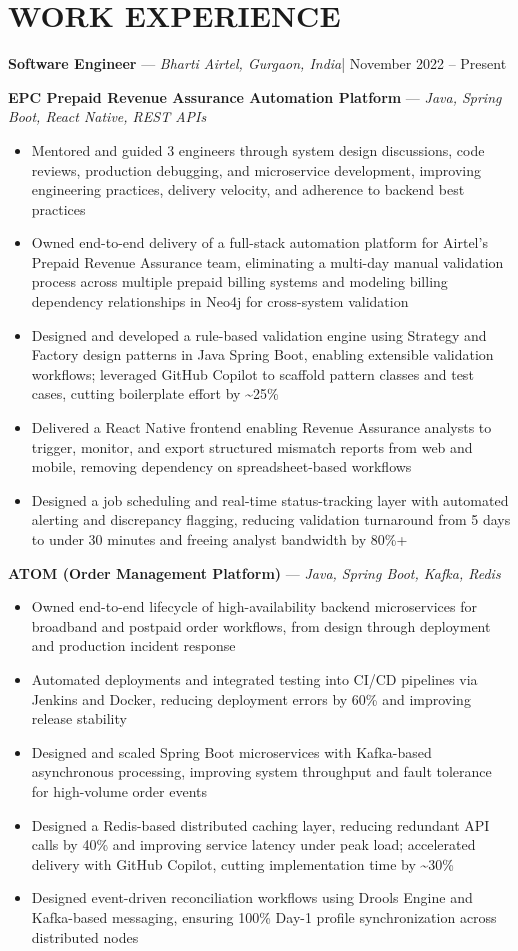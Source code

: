 \documentclass[10.5pt,a4paper]{article}
\newcommand{\role}[3]{\textbf{\large #1} \hspace{0.4em}---\hspace{0.4em} \textit{#2}\hfill {\color{greytxt}\small | #3}\par\vspace{2pt}}
\newcommand{\proj}[2]{\vspace{4pt}\textbf{#1} \hspace{0.3em}---\hspace{0.3em} \textit{#2}\par\vspace{-1pt}}
\newenvironment{bul}{\begin{itemize}[leftmargin=2.2em,itemsep=2pt,topsep=2pt,parsep=0pt,label=\textbullet]}{\end{itemize}}
\begin{document}
\section{WORK EXPERIENCE}
\role{Software Engineer}{Bharti Airtel, Gurgaon, India}{November 2022 -- Present}

\proj{EPC Prepaid Revenue Assurance Automation Platform}{Java, Spring Boot, React Native, REST APIs}
\begin{bul}
\item Mentored and guided 3 engineers through system design discussions, code reviews, production debugging, and microservice development, improving engineering practices, delivery velocity, and adherence to backend best practices
\item Owned end-to-end delivery of a full-stack automation platform for Airtel's Prepaid Revenue Assurance team, eliminating a multi-day manual validation process across multiple prepaid billing systems and modeling billing dependency relationships in Neo4j for cross-system validation
\item Designed and developed a rule-based validation engine using Strategy and Factory design patterns in Java Spring Boot, enabling extensible validation workflows; leveraged GitHub Copilot to scaffold pattern classes and test cases, cutting boilerplate effort by \textasciitilde25\%
\item Delivered a React Native frontend enabling Revenue Assurance analysts to trigger, monitor, and export structured mismatch reports from web and mobile, removing dependency on spreadsheet-based workflows
\item Designed a job scheduling and real-time status-tracking layer with automated alerting and discrepancy flagging, reducing validation turnaround from 5 days to under 30 minutes and freeing analyst bandwidth by 80\%+
\end{bul}

\proj{ATOM (Order Management Platform)}{Java, Spring Boot, Kafka, Redis}
\begin{bul}
\item Owned end-to-end lifecycle of high-availability backend microservices for broadband and postpaid order workflows, from design through deployment and production incident response
\item Automated deployments and integrated testing into CI/CD pipelines via Jenkins and Docker, reducing deployment errors by 60\% and improving release stability
\item Designed and scaled Spring Boot microservices with Kafka-based asynchronous processing, improving system throughput and fault tolerance for high-volume order events
\item Designed a Redis-based distributed caching layer, reducing redundant API calls by 40\% and improving service latency under peak load; accelerated delivery with GitHub Copilot, cutting implementation time by \textasciitilde30\%
\item Designed event-driven reconciliation workflows using Drools Engine and Kafka-based messaging, ensuring 100\% Day-1 profile synchronization across distributed nodes
\end{bul}
\end{document}

